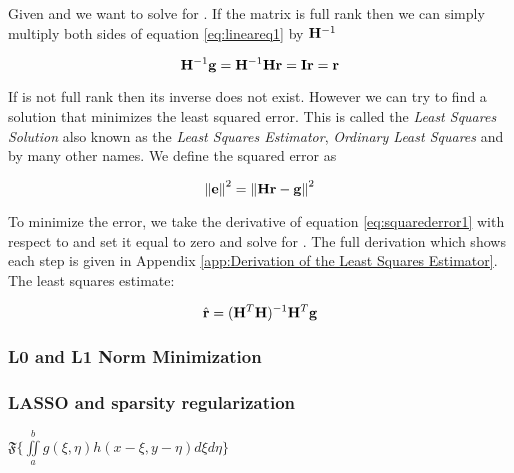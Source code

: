 Given  and  we want to solve for . If the matrix is full rank then we can simply multiply both sides of equation \ref{eq:lineareq1} by $\mathbf{H}^{-1}$ 

\begin{equation}
	\mathbf{H}^{-1} \mathbf{g} = \mathbf{H}^{-1} \mathbf{Hr} = \mathbf{I} \mathbf{r} = \mathbf{r}
\end{equation}

If  is not full rank then its inverse does not exist. However we can try to find a solution  that minimizes the least squared error. This is called the \emph{Least Squares Solution} also known as the \emph{Least Squares Estimator}, \emph{Ordinary Least Squares} and by many other names. We define the squared error as

\begin{equation}\label{eq:squarederror1}
	\mathbf{ \lVert \mathbf{e} \rVert }^2 =    \mathbf{ \lVert \mathbf{Hr-g} \rVert }^2
\end{equation}

\noindent To minimize the error, we take the derivative of equation \ref{eq:squarederror1} with respect to  and set it equal to zero and solve for . The full derivation which shows each step is given in Appendix \ref{app:Derivation of the Least Squares Estimator}. The least squares estimate:

\begin{equation}
	\hat{ \mathbf{r} } = ( \mathbf{H}^T \mathbf{H} )^{-1} \mathbf{H}^T \mathbf{g}
\end{equation}

\subsubsection{L0 and L1 Norm Minimization}

\subsubsection{LASSO and sparsity regularization}

$  \mathfrak{F} \{ \iint\limits_{a}^{b}  g( \xi, \eta )  h( x - \xi, y - \eta )  d \xi d \eta \}  $

%  
%



